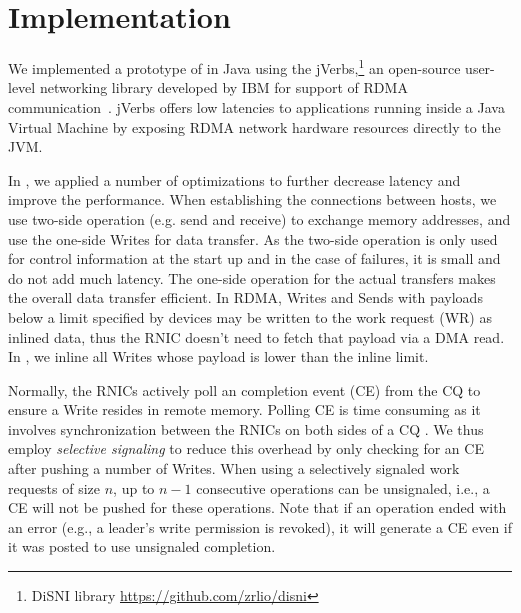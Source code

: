 \section{Implementation}
\label{sec:implementation}

%

We implemented a prototype of \libname in Java using the jVerbs,\footnote{DiSNI
library \url{https://github.com/zrlio/disni}} an
open-source user-level networking library developed by IBM for support of RDMA
communication~\cite{stuedi2013jverbs}. jVerbs offers low latencies to applications running inside a Java
Virtual Machine by exposing RDMA network hardware resources directly to the JVM.

In \libname, we applied a number of optimizations to further decrease latency
and improve the performance. When establishing the connections between hosts, we
use two-side operation (e.g. send and receive) to exchange memory addresses, and
use the one-side Writes for data transfer. As the two-side operation is only
used for control information at the start up and in the case of failures, it is
small and do not add much latency. The one-side operation for the actual
transfers makes the overall data transfer efficient. In RDMA, Writes and Sends
with payloads below a limit specified by devices may be written to the work
request (WR) as inlined data, thus the RNIC doesn't need to fetch that payload
via a DMA read. In \libname, we inline all Writes whose payload is lower than
the inline limit. 

Normally, the RNICs actively poll an completion event (CE) from the CQ to ensure
a Write resides in remote memory. Polling CE is time consuming as it involves
synchronization between the RNICs on both sides of a CQ \cite{APUS}. We thus
employ \emph{selective signaling} \cite{Kalia2014} to reduce this overhead by
only checking for an CE after pushing a number of Writes. When using a
selectively signaled work requests of size $n$, up to $n-1$ consecutive
operations can be unsignaled, i.e., a CE will not be pushed for these
operations. Note that if an operation ended with an error (e.g., a leader's
write permission is revoked), it will generate a CE even if it was posted to use
unsignaled completion.

